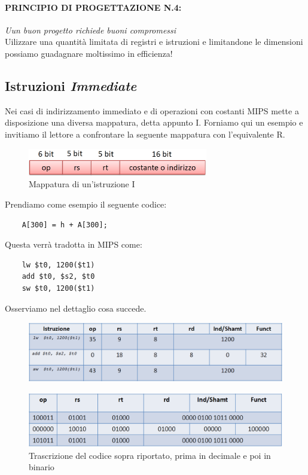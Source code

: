 \documentclass[class=book, crop=false]{standalone}
\begin{document}
\paragraph{PRINCIPIO DI PROGETTAZIONE N.4:}
\emph{Uun buon progetto richiede buoni compromessi}\\

Uilizzare una quantità limitata di registri e istruzioni e limitandone le dimensioni possiamo guadagnare moltissimo in efficienza!

\subsection{Istruzioni \emph{Immediate}}
Nei casi di indirizzamento immediato e di operazioni con costanti MIPS mette a disposizione una diversa mappatura, detta appunto I. Forniamo qui un esempio e invitiamo il lettore a confrontare la seguente mappatura con l'equivalente R.
\begin{figure}[H]
	\centering
	\includegraphics[width=0.7\textwidth,keepaspectratio]{I.png}
	\caption{Mappatura di un'istruzione I}
\end{figure}

Prendiamo come esempio il seguente codice:
\begin{verbatim}
	A[300] = h + A[300];
\end{verbatim}
Questa verrà tradotta in MIPS come:
\begin{verbatim}
	lw $t0, 1200($t1)
	add $t0, $s2, $t0
	sw $t0, 1200($t1)
\end{verbatim}
Osserviamo nel dettaglio cosa succede.
\begin{figure}[H]
	\centering
	\includegraphics[width=1\textwidth,keepaspectratio]{nat.png}
\end{figure}
\begin{figure}[H]
	\centering
	\includegraphics[width=1\textwidth,keepaspectratio]{bin.png}
	\caption{Trascrizione del codice sopra riportato, prima in decimale e poi in binario}
\end{figure}
\end{document}
